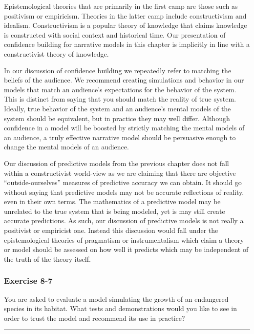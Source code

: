 \documentclass[]{memoir}
\begin{document}
Epistemological theories that are primarily in the first camp are those
such as positivism or empiricism. Theories in the latter camp include
constructivism and idealism. Constructivism is a popular theory of
knowledge that claims knowledge is constructed with social context and
historical time. Our presentation of confidence building for narrative
models in this chapter is implicitly in line with a constructivist
theory of knowledge.

In our discussion of confidence building we repeatedly refer to matching
the beliefs of the audience. We recommend creating simulations and
behavior in our models that match an audience's expectations for the
behavior of the system. This is distinct from saying that you should
match the reality of true system. Ideally, true behavior of the system
and an audience's mental models of the system should be equivalent, but
in practice they may well differ. Although confidence in a model will be
boosted by strictly matching the mental models of an audience, a truly
effective narrative model should be persuasive enough to change the
mental models of an audience.

Our discussion of predictive models from the previous chapter does not
fall within a constructivist world-view as we are claiming that there
are objective ``outside-ourselves'' measures of predictive accuracy we
can obtain. It should go without saying that predictive models may not
be accurate reflections of reality, even in their own terms. The
mathematics of a predictive model may be unrelated to the true system
that is being modeled, yet is may still create accurate predictions. As
such, our discussion of predictive models is not really a positivist or
empiricist one. Instead this discussion would fall under the
epistemological theories of pragmatism or instrumentalism which claim a
theory or model should be assessed on how well it predicts which may be
independent of the truth of the theory itself.

\subsubsection{Exercise 8-7}

You are asked to evaluate a model simulating the growth of an endangered
species in its habitat. What tests and demonstrations would you like to
see in order to trust the model and recommend its use in practice?

\begin{center}\rule{3in}{0.4pt}\end{center}
\end{document}

